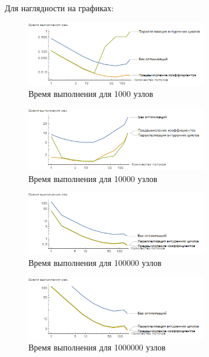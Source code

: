 \documentclass[a4paper,12pt,titlepage,finall]{article}
\begin{document}
\newpage
\par
Для наглядности на графиках:
\begin{figure}[h]
\centering
\includegraphics[width=0.7\textwidth]{plot1k.png}
\caption{Время выполнения для 1000 узлов}
\end{figure}
\begin{figure}[h]
\centering
\includegraphics[width=0.7\textwidth]{plot10k.png}
\caption{Время выполнения для 10000 узлов}
\end{figure}
\begin{figure}[h]
\centering
\includegraphics[width=0.7\textwidth]{plot100k.png}
\caption{Время выполнения для 100000 узлов}
\end{figure}
\begin{figure}[h]
\centering
\includegraphics[width=0.7\textwidth]{plot1M.png}
\caption{Время выполнения для 1000000 узлов}
\end{figure}
\newpage
\end{document}
